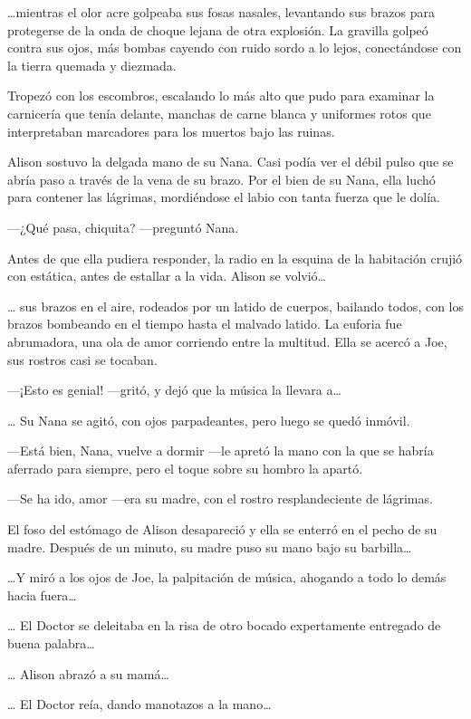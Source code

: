 {\ldots{}mientras el olor acre golpeaba sus fosas nasales, levantando sus
 brazos para protegerse de la onda de choque lejana de otra explosión. La
 gravilla golpeó contra sus ojos, más bombas cayendo con ruido sordo a lo
lejos, conectándose con la tierra quemada y diezmada.}

{Tropezó con los escombros, escalando lo más alto que pudo para examinar
 la carnicería que tenía delante, manchas de carne blanca y uniformes
 rotos que interpretaban marcadores para los muertos bajo las
ruinas.}

{Alison sostuvo la delgada mano de su Nana. Casi
 podía ver el débil pulso que se abría paso a través de la vena de su
 brazo. Por el bien de su Nana, ella luchó para contener las lágrimas,
mordiéndose el labio con tanta fuerza que le dolía.}

{---¿Qué pasa, chiquita? ---preguntó Nana.}

{Antes de que ella pudiera responder, la radio en la esquina de la
 habitación crujió con estática, antes de estallar a la vida. Alison se
 volvió\ldots{}}

{\ldots{} sus brazos en el aire, rodeados por un latido de cuerpos,
 bailando todos, con los brazos bombeando en el tiempo hasta el malvado
 latido. La euforia fue abrumadora, una ola de amor corriendo entre la
multitud. Ella se acercó a Joe, sus rostros casi se tocaban.}

{---¡Esto es genial! ---gritó, y dejó que la música la llevara
 a\ldots{}}

{\ldots{} Su Nana se agitó, con ojos parpadeantes, pero luego se quedó
inmóvil.}

{---Está bien, Nana, vuelve a dormir ---le apretó la mano con la que se
habría aferrado para siempre, pero el toque sobre su hombro la apartó.}

{---Se ha ido, amor ---era su madre, con el rostro resplandeciente de
lágrimas.}

{El foso del estómago de Alison desapareció y ella se enterró en el pecho
 de su madre. Después de un minuto, su madre puso su mano bajo su
 barbilla\ldots{}}

{\ldots{}Y miró a los ojos de Joe, la palpitación de música, ahogando a
 todo lo demás hacia fuera\ldots{}}

{\ldots{} El Doctor se
 deleitaba en la risa de otro bocado expertamente entregado de buena
 palabra\ldots{}}

{\ldots{} Alison abrazó a su mamá\ldots{}}

{\ldots{} El Doctor reía, dando manotazos a la mano\ldots{}}

